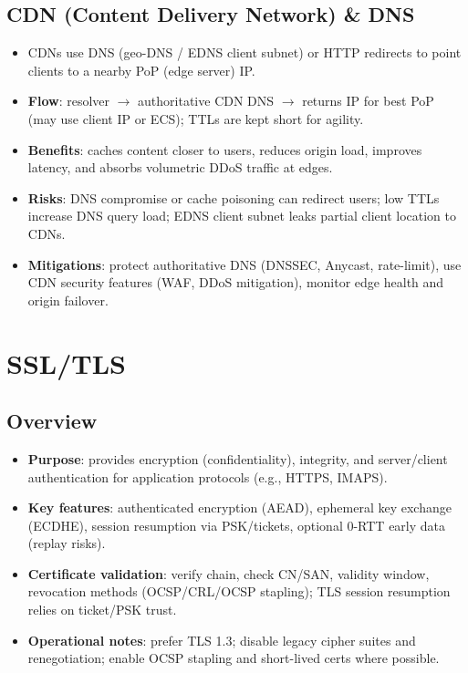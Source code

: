 \documentclass[11pt]{article}
\begin{document}
\subsection{CDN (Content Delivery Network) \& DNS}
\begin{itemize}
  \item CDNs use DNS (geo-DNS / EDNS client subnet) or HTTP redirects to point clients to a nearby PoP (edge server) IP.
  
  \item \textbf{Flow}: resolver $\rightarrow$ authoritative CDN DNS $\rightarrow$ returns IP for best PoP (may use client IP or ECS); TTLs are kept short for agility.
  
  \item \textbf{Benefits}: caches content closer to users, reduces origin load, improves latency, and absorbs volumetric DDoS traffic at edges.
  
  \item \textbf{Risks}: DNS compromise or cache poisoning can redirect users; low TTLs increase DNS query load; EDNS client subnet leaks partial client location to CDNs.
  
  \item \textbf{Mitigations}: protect authoritative DNS (DNSSEC, Anycast, rate-limit), use CDN security features (WAF, DDoS mitigation), monitor edge health and origin failover.
\end{itemize}

\section{SSL/TLS}

\subsection{Overview}
\begin{itemize}
  \item \textbf{Purpose}: provides encryption (confidentiality), integrity, and server/client authentication for application protocols (e.g., HTTPS, IMAPS).
  
  \item \textbf{Key features}: authenticated encryption (AEAD), ephemeral key exchange (ECDHE), session resumption via PSK/tickets, optional 0-RTT early data (replay risks).
  
  \item \textbf{Certificate validation}: verify chain, check CN/SAN, validity window, revocation methods (OCSP/CRL/OCSP stapling); TLS session resumption relies on ticket/PSK trust.
  
  \item \textbf{Operational notes}: prefer TLS 1.3; disable legacy cipher suites and renegotiation; enable OCSP stapling and short-lived certs where possible.
\end{itemize}
\end{document}
